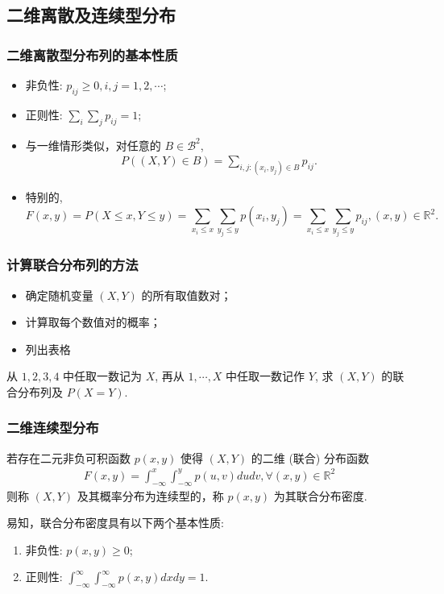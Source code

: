 \documentclass[Prob-All.tex]{subfiles}
\begin{document}
\subsection{二维离散及连续型分布}
\begin{frame}
  \frametitle{二维离散型分布列的基本性质}
  \begin{itemize}[<+-|alert@+>]
  \item 非负性: $p_{ij}\ge 0, i,j=1,2,\cdots $;
  \item 正则性: $\sum_i\sum_jp_{ij}=1$;
  \item 与一维情形类似，对任意的 $B\in \mathcal{B}^2$,
    \begin{eqnarray*}
      P((X,Y)\in B)=\sum_{i, j: (x_i,y_j)\in B}p_{ij}.
    \end{eqnarray*}
\item 特别的,
$$F(x, y)=P(X\leqslant x, Y \leqslant y)=\sum_{x_{i} \leqslant x} \sum_{y_{j} \leqslant y} p\left(x_{i}, y_{j}\right)=\sum_{x_{i} \leqslant x} \sum_{y_{j} \leqslant y} p_{ij}, (x, y) \in \mathbb{R}^{2}.$$
  \end{itemize}
\end{frame}
\begin{frame}
  \frametitle{计算联合分布列的方法}
  \begin{itemize}[<+-|alert@+>]
  \item 确定随机变量 $(X, Y)$ 的所有取值数对；
  \item 计算取每个数值对的概率；
  \item 列出表格
  \end{itemize}
  \pause
  \begin{exam}
    从 $1,2,3,4$ 中任取一数记为 $X$, 再从 $1,\cdots,X$ 中任取一数记作 $Y$, 求 $(X,Y)$ 的联合分布列及 $P (X=Y)$.
  \end{exam}
\end{frame}
\begin{frame}
  \frametitle{二维连续型分布}
  \begin{defi}
    若存在二元非负可积函数 $p (x,y)$ 使得 $(X,Y)$ 的二维 (联合) 分布函数
    \begin{eqnarray*}
      F(x,y)=\int_{-\infty}^x\int_{-\infty}^yp(u,v)dudv, \forall (x,y)\in\mathbb{R}^2
    \end{eqnarray*}
    则称 $(X,Y)$ 及其概率分布为连续型的，称 $p (x,y)$ 为其联合分布密度.
  \end{defi}
  \vspace{0.5cm}

  \pause
  易知，联合分布密度具有以下两个基本性质:
  \begin{enumerate}[<+-|alert@+>]
  \item 非负性: $p (x,y)\ge 0$;
  \item 正则性: $\int_{-\infty}^\infty\int_{-\infty}^\infty p (x,y) dxdy=1$.
  \end{enumerate}



\end{frame}
\end{document}
